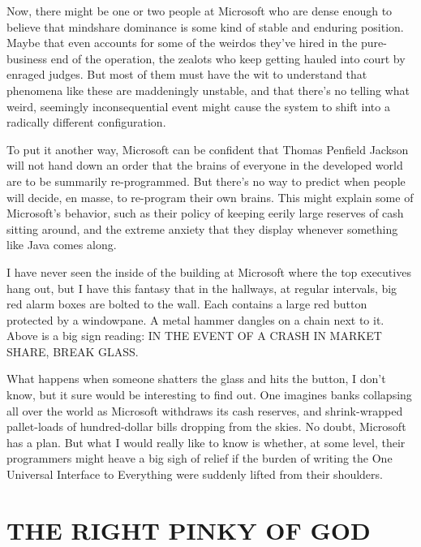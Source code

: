 \documentclass[
  fontsize=11pt,
  paper=landscape,
  twocolumn=true,
  pagesize=pdftex,
  headings=small,
  DIV=15,
  ]{scrartcl}
\begin{document}
Now, there might be one or two people at Microsoft who are dense enough
to believe that mindshare dominance is some kind of stable and enduring
position. Maybe that even accounts for some of the weirdos they've hired
in the pure-business end of the operation, the zealots who keep getting
hauled into court by enraged judges. But most of them must have the wit
to understand that phenomena like these are maddeningly unstable, and
that there's no telling what weird, seemingly inconsequential event
might cause the system to shift into a radically different
configuration.

To put it another way, Microsoft can be confident that Thomas Penfield
Jackson will not hand down an order that the brains of everyone in the
developed world are to be summarily re-programmed. But there's no way to
predict when people will decide, en masse, to re-program their own
brains. This might explain some of Microsoft's behavior, such as their
policy of keeping eerily large reserves of cash sitting around, and the
extreme anxiety that they display whenever something like Java comes
along.

I have never seen the inside of the building at Microsoft where the top
executives hang out, but I have this fantasy that in the hallways, at
regular intervals, big red alarm boxes are bolted to the wall. Each
contains a large red button protected by a windowpane. A metal hammer
dangles on a chain next to it. Above is a big sign reading: IN THE EVENT
OF A CRASH IN MARKET SHARE, BREAK GLASS.

What happens when someone shatters the glass and hits the button, I
don't know, but it sure would be interesting to find out. One imagines
banks collapsing all over the world as Microsoft withdraws its cash
reserves, and shrink-wrapped pallet-loads of hundred-dollar bills
dropping from the skies. No doubt, Microsoft has a plan. But what I
would really like to know is whether, at some level, their programmers
might heave a big sigh of relief if the burden of writing the One
Universal Interface to Everything were suddenly lifted from their
shoulders.

\section{THE RIGHT PINKY OF GOD}
\end{document}
